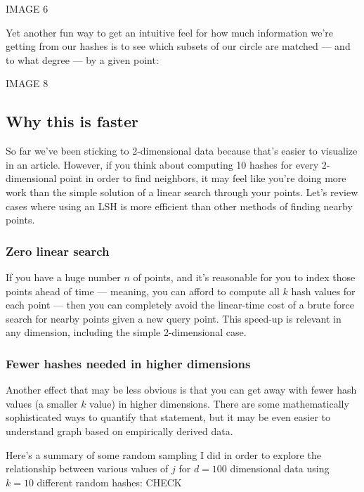 \documentclass[20pt,]{extarticle}
\begin{document}
IMAGE 6

Yet another fun way to get an intuitive feel for how much information
we're getting from our hashes is to see which subsets of our circle are
matched --- and to what degree --- by a given point:

IMAGE 8

\subsection{Why this is faster}\label{why-this-is-faster}

So far we've been sticking to 2-dimensional data because that's easier
to visualize in an article. However, if you think about computing 10
hashes for every 2-dimensional point in order to find neighbors, it may
feel like you're doing more work than the simple solution of a linear
search through your points. Let's review cases where using an LSH is
more efficient than other methods of finding nearby points.

\subsubsection{Zero linear search}\label{zero-linear-search}

If you have a huge number \(n\) of points, and it's reasonable for you
to index those points ahead of time --- meaning, you can afford to
compute all \(k\) hash values for each point --- then you can completely
avoid the linear-time cost of a brute force search for nearby points
given a new query point. This speed-up is relevant in any dimension,
including the simple 2-dimensional case.

\subsubsection{Fewer hashes needed in higher
dimensions}\label{fewer-hashes-needed-in-higher-dimensions}

Another effect that may be less obvious is that you can get away with
fewer hash values (a smaller \(k\) value) in higher dimensions. There
are some mathematically sophisticated ways to quantify that statement,
but it may be even easier to understand graph based on empirically
derived data.

Here's a summary of some random sampling I did in order to explore the
relationship between various values of \(j\) for \(d=100\) dimensional
data using \(k=10\) different random hashes: CHECK
\end{document}
